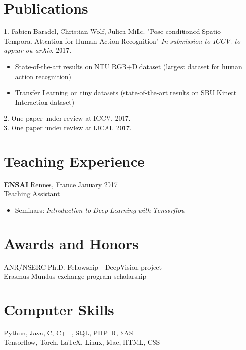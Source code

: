 \documentclass[10pt]{res} %
\begin{document}
\begin{resume}

\section{\large Publications} 
1. Fabien Baradel, Christian Wolf, Julien Mille. "Pose-conditioned Spatio-Temporal Attention for Human Action Recognition" \textit{In submission to ICCV, to appear on arXiv}. 2017.
\begin{itemize}
\item State-of-the-art results on NTU RGB+D dataset (largest dataset for human action recognition)
\item Transfer Learning on tiny datasets (state-of-the-art results on SBU Kinect Interaction dataset)
\end{itemize}
2. One paper under review at ICCV. 2017.\\
3. One paper under review at IJCAI. 2017.





\section{\large Teaching Experience} 
\textbf{ENSAI} \hfill Rennes, France \hfill January 2017 \\
Teaching Assistant
\begin{itemize}
\item Seminars: \textit{Introduction to Deep Learning with Tensorflow}
\end{itemize}


\section{\large Awards and Honors} 
ANR/NSERC Ph.D. Fellowship - DeepVision project \\
Erasmus Mundus exchange program scholarship


\section{\large Computer Skills} 
Python, Java, C, C++, SQL, PHP, R, SAS \\
Tensorflow, Torch, \LaTeX, Linux, Mac, HTML, CSS \\

\end{resume}
\end{document}
